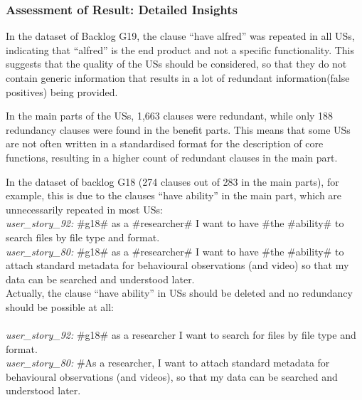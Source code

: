 \endgroup


\subsubsection*{Assessment of Result: Detailed Insights}
In the dataset of Backlog G19, the clause \enquote{have alfred} was repeated in all USs, indicating that \enquote{alfred} is the end product and not a specific functionality. This suggests that the quality of the USs should be considered, so that they do not contain generic information that results in a lot of redundant information(false positives) being provided.

In the main parts of the USs, 1,663 clauses were redundant, while only 188 redundancy clauses were found in the benefit parts. This means that some USs are not often written in a standardised format for the description of core functions, resulting in a higher count of redundant clauses in the main part.
\begin{example}
In the dataset of backlog G18 (274 clauses out of 283 in the main parts), for example, this is due to the clauses \enquote{have ability} in the main part, which are unnecessarily repeated in most USs:\\
\textit{user\_story\_92:} \#g18\# as a \#researcher\# I want to have \#the \#ability\# to search files by file type and format.\\
\textit{user\_story\_80:} \#g18\# as a \#researcher\# I want to have \#the \#ability\# to attach standard metadata for behavioural observations (and video) so that my data can be searched and understood later.\\
Actually, the clause \enquote{have ability} in USs should be deleted and no redundancy should be possible at all:\\\\
\textit{user\_story\_92:} \#g18\# as a researcher I want to search for files by file type and format.\\
\textit{user\_story\_80:} \#As a researcher, I want to attach standard metadata for behavioural observations (and videos), so that my data can be searched and understood later.
\end{example}

